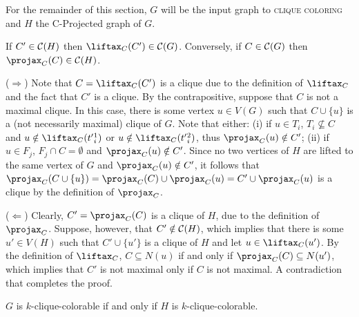 For the remainder of this section, $G$ will be the input graph to \textsc{clique coloring} and $H$ the C-Projected graph of $G$.


\begin{lemma}
    \label{lem:lift_proj_clique}
    If $C' \in \mathcal{C}(H)$ then $\Lift{C}(C') \in \clq(G)$. Conversely, if $C \in \mathcal{C}(G)$ then $\Proj{C}(C) \in \clq(H)$.
\end{lemma}

\begin{tproof}
    ($\Rightarrow$) Note that $C = \Lift{C}(C')$ is a clique due to the definition of $\Lift{C}$ and the fact that $C'$ is a clique.
    By the contrapositive, suppose that $C$ is not a maximal clique.
    In this case, there is some vertex $u \in V(G)$ such that $C \cup \{u\}$ is a (not necessarily maximal) clique of $G$. Note that either:
    (i) if $u \in T_i$, $T_i \nsubseteq C$ and $u \notin \Lift{C}(t'{_i^1})$ or $u \notin \Lift{C}(t'{_i^2})$, thus $\Proj{C}(u) \notin C'$;
    (ii) if $u \in F_j$, $F_j \cap C = \emptyset$ and $\Proj{C}(u) \notin C'$.
    Since no two vertices of $H$ are lifted to the same vertex of $G$ and $\Proj{C}(u) \notin C'$, it follows that  $\Proj{C}(C \cup \{u\}) = \Proj{C}(C) \cup \Proj{C}(u) = C' \cup \Proj{C}(u)$ is a clique by the definition of $\Proj{C}$.
    
    ($\Leftarrow$) Clearly, $C' = \Proj{C}(C)$ is a clique of $H$, due to the definition of $\Proj{C}$.
    Suppose, however, that $C' \notin \mathcal{C}(H)$, which implies that there is some $u' \in V(H)$ such that $C' \cup \{u'\}$ is a clique of $H$ and let $u \in \Lift{C}(u')$.
    By the definition of $\Lift{C}$, $C \subseteq N(u)$ if and only if $\Proj{C}(C) \subseteq N(u')$, which implies that $C'$ is not maximal only if $C$ is not maximal.
    A contradiction that completes the proof.
\end{tproof}

\begin{theorem}
    \label{thm:projected_clique_coloring}
     $G$ is $k$-clique-colorable if and only if $H$ is $k$-clique-colorable.
\end{theorem}

